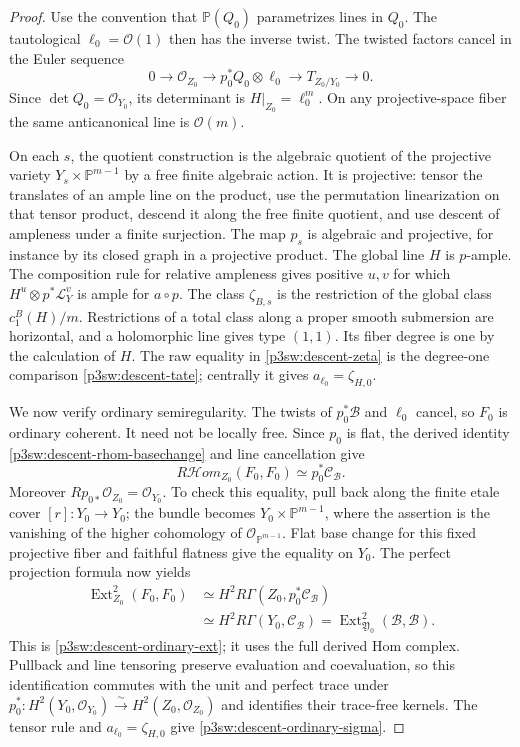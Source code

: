 \documentclass[11pt]{article}
\numberwithin{equation}{section}
\begin{document}
\begin{proof}
Use the convention that \(\mathbb P(Q_0)\) parametrizes lines in
\(Q_0\).  The tautological \(\ell_0=\mathcal O(1)\) then has the
inverse twist.  The twisted factors cancel in the Euler sequence
\[
 0\longrightarrow\mathcal O_{Z_0}
 \longrightarrow p_0^*Q_0\otimes\ell_0
 \longrightarrow T_{Z_0/Y_0}\longrightarrow0.
\]
Since \(\det Q_0=\mathcal O_{Y_0}\), its determinant is
\(H|_{Z_0}=\ell_0^m\).  On any projective-space fiber the same
anticanonical line is \(\mathcal O(m)\).

On each \(s\), the quotient construction is the algebraic quotient
of the projective variety \(Y_s\times\mathbb P^{m-1}\) by a free
finite algebraic action.  It is projective: tensor the translates of
an ample line on the product, use the permutation linearization on
that tensor product, descend it along the free finite quotient, and
use descent of ampleness under a finite surjection.  The map \(p_s\)
is algebraic and projective, for instance by its closed graph in a
projective product.  The global line \(H\) is \(p\)-ample.  The
composition rule for relative ampleness gives positive \(u,v\) for
which \(H^u\otimes p^*\mathcal L_Y^v\) is ample for \(a\circ p\).
The class \(\zeta_{B,s}\) is the restriction of the global class
\(c_1^B(H)/m\).  Restrictions of a total class along a proper smooth
submersion are horizontal, and a holomorphic line gives type \((1,1)\).
Its fiber degree is one by the calculation of \(H\).  The raw equality
in \eqref{p3sw:descent-zeta} is the degree-one comparison
\eqref{p3sw:descent-tate}; centrally it gives
\(a_{\ell_0}=\zeta_{H,0}\).

We now verify ordinary semiregularity.  The twists of \(p_0^*\mathcal B\)
and \(\ell_0\) cancel, so \(F_0\) is ordinary coherent.  It need not
be locally free.  Since \(p_0\) is flat, the derived identity
\eqref{p3sw:descent-rhom-basechange} and line cancellation give
\[
 R\mathcal{H}om_{Z_0}(F_0,F_0)\simeq p_0^*\mathcal C_{\mathcal B}.
\]
Moreover \(Rp_{0*}\mathcal O_{Z_0}=\mathcal O_{Y_0}\).  To check
this equality, pull back along the finite etale cover
\([r]:Y_0\to Y_0\); the bundle becomes
\(Y_0\times\mathbb P^{m-1}\), where the assertion is the vanishing
of the higher cohomology of \(\mathcal O_{\mathbb P^{m-1}}\).
Flat base change for this fixed projective fiber and faithful flatness
give the equality on \(Y_0\).  The perfect projection formula now yields
\[
 \begin{split}
 \operatorname{Ext}^2_{Z_0}(F_0,F_0)
 &\simeq H^2R\Gamma(Z_0,p_0^*\mathcal C_{\mathcal B})\\
 &\simeq H^2R\Gamma(Y_0,\mathcal C_{\mathcal B})
 =\operatorname{Ext}^2_{\mathfrak Y_0}(\mathcal B,\mathcal B).
 \end{split}
\]
This is \eqref{p3sw:descent-ordinary-ext}; it uses the full derived
Hom complex.  Pullback and line tensoring preserve evaluation and
coevaluation, so this identification commutes with the unit and perfect
trace under \(p_0^*:H^2(Y_0,\mathcal O_{Y_0})\xrightarrow{\sim}
H^2(Z_0,\mathcal O_{Z_0})\) and identifies their trace-free kernels.
The tensor rule and
\(a_{\ell_0}=\zeta_{H,0}\) give
\eqref{p3sw:descent-ordinary-sigma}.


\end{proof}
\end{document}
